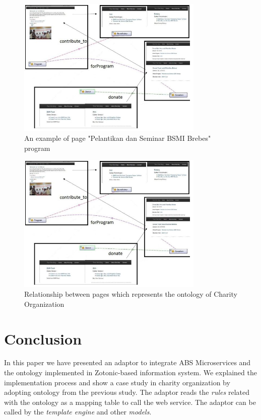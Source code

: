 \documentclass[conference]{IEEEtran}
\begin{document}
\begin{figure}[h]
	\centering
	\includegraphics[width=3.5in]{samplepage}
	
	\caption{An example of page "Pelantikan dan Seminar BSMI Brebes" program}
	\label{view_program}
\end{figure}

\begin{figure}[h]
	\centering
	\includegraphics[width=3.5in]{pagerelation}
	
	\caption{Relationship between pages which represents the ontology of Charity Organization}
	\label{view_program}
\end{figure}

\section{Conclusion} \label{conclusion}
In this paper we have presented an adaptor to integrate ABS Microservices and the ontology implemented in Zotonic-based information system. We explained the implementation process and show a case study in charity organization by adopting ontology from the previous study. The adaptor reads the \textit{rules} related with the ontology as a mapping table to call the web service. The adaptor can be called by the \textit{template engine} and other \textit{models}.
\end{document}
